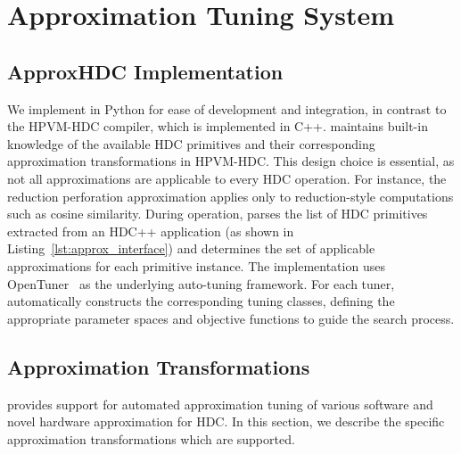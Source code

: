 \section{Approximation Tuning System}
\label{sec:approx-tuning-system}


\subsection{ApproxHDC Implementation}
\label{sec:approxhdc-impl}
We implement \pname{} in Python for ease of development and integration, in contrast to the HPVM-HDC compiler, which is implemented in C++. \pname{} maintains built-in knowledge of the available HDC primitives and their corresponding approximation transformations in HPVM-HDC. This design choice is essential, as not all approximations are applicable to every HDC operation. For instance, the reduction perforation approximation applies only to reduction-style computations such as cosine similarity.
During operation, \pname{} parses the list of HDC primitives extracted from an HDC++ application (as shown in Listing~\ref{lst:approx_interface}) and determines the set of applicable approximations for each primitive instance. %
The implementation uses OpenTuner~\cite{opentuner} as the underlying auto-tuning framework. For each tuner, \pname{} automatically constructs the corresponding tuning classes, defining the appropriate parameter spaces and objective functions to guide the search process.

\subsection{Approximation Transformations}
\label{sec:hdc-approximations}
\pname{} provides support for automated approximation tuning of various software and novel hardware approximation for HDC. In this section, we describe the specific approximation transformations which are supported. 


